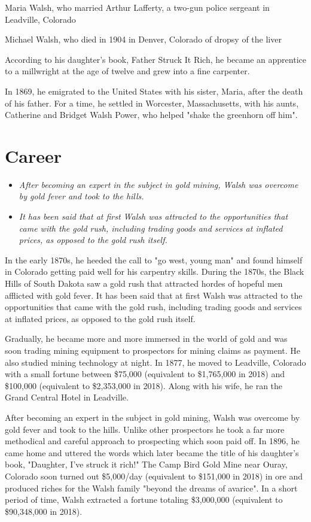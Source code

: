 Maria Walsh, who married Arthur Lafferty, a two-gun police sergeant in
Leadville, Colorado

Michael Walsh, who died in 1904 in Denver, Colorado of dropsy of the
liver

According to his daughter's book, Father Struck It Rich, he became an
apprentice to a millwright at the age of twelve and grew into a fine
carpenter.

In 1869, he emigrated to the United States with his sister, Maria, after
the death of his father. For a time, he settled in Worcester,
Massachusetts, with his aunts, Catherine and Bridget Walsh Power, who
helped "shake the greenhorn off him".

\section{Career}\label{career}

\begin{itemize}
\item
  \emph{After becoming an expert in the subject in gold mining, Walsh
  was overcome by gold fever and took to the hills.}
\item
  \emph{It has been said that at first Walsh was attracted to the
  opportunities that came with the gold rush, including trading goods
  and services at inflated prices, as opposed to the gold rush itself.}
\end{itemize}

In the early 1870s, he heeded the call to "go west, young man" and found
himself in Colorado getting paid well for his carpentry skills. During
the 1870s, the Black Hills of South Dakota saw a gold rush that
attracted hordes of hopeful men afflicted with gold fever. It has been
said that at first Walsh was attracted to the opportunities that came
with the gold rush, including trading goods and services at inflated
prices, as opposed to the gold rush itself.

Gradually, he became more and more immersed in the world of gold and was
soon trading mining equipment to prospectors for mining claims as
payment. He also studied mining technology at night. In 1877, he moved
to Leadville, Colorado with a small fortune between \$75,000 (equivalent
to \$1,765,000 in 2018) and \$100,000 (equivalent to \$2,353,000 in
2018). Along with his wife, he ran the Grand Central Hotel in Leadville.

After becoming an expert in the subject in gold mining, Walsh was
overcome by gold fever and took to the hills. Unlike other prospectors
he took a far more methodical and careful approach to prospecting which
soon paid off. In 1896, he came home and uttered the words which later
became the title of his daughter's book, "Daughter, I've struck it
rich!" The Camp Bird Gold Mine near Ouray, Colorado soon turned out
\$5,000/day (equivalent to \$151,000 in 2018) in ore and produced riches
for the Walsh family "beyond the dreams of avarice". In a short period
of time, Walsh extracted a fortune totaling \$3,000,000 (equivalent to
\$90,348,000 in 2018).

